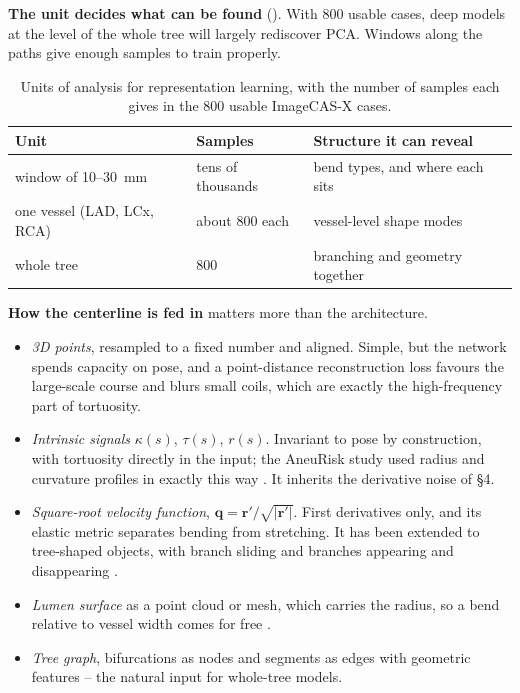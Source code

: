 \textbf{The unit decides what can be found} (). With 800 usable cases, deep
models at the level of the whole tree will largely rediscover PCA. Windows along the paths give
enough samples to train properly.

\begin{table}[htbp]
  \centering
  \small
  \begin{tabular}{@{}lll@{}}
    \toprule
    Unit & Samples & Structure it can reveal \\
    \midrule
    window of 10--30~mm & tens of thousands & bend types, and where each sits \\
    one vessel (LAD, LCx, RCA) & about 800 each & vessel-level shape modes \\
    whole tree & 800 & branching and geometry together \\
    \bottomrule
  \end{tabular}
  \caption{Units of analysis for representation learning, with the number of samples each gives
    in the 800 usable ImageCAS-X cases.}
  \label{tab:week3-units}
\end{table}

\textbf{How the centerline is fed in} matters more than the architecture.
\begin{itemize}
  \item \emph{3D points}, resampled to a fixed number and aligned. Simple, but the network spends
    capacity on pose, and a point-distance reconstruction loss favours the large-scale course and
    blurs small coils, which are exactly the high-frequency part of tortuosity.
  \item \emph{Intrinsic signals} $\kappa(s)$, $\tau(s)$, $r(s)$. Invariant to pose by
    construction, with tortuosity directly in the input; the AneuRisk study used radius and
    curvature profiles in exactly this way \cite{sangalli2009aneurisk}. It inherits the derivative
    noise of \S4.
  \item \emph{Square-root velocity function}, $\mathbf q = \mathbf r'/\sqrt{\lvert\mathbf r'\rvert}$.
    First derivatives only, and its elastic metric separates bending from stretching. It has been
    extended to tree-shaped objects, with branch sliding and branches appearing and disappearing
    \cite{wang2024elastictrees}.
  \item \emph{Lumen surface} as a point cloud or mesh, which carries the radius, so a bend relative
    to vessel width comes for free \cite{beetz2025pointvae, griffo2026wss}.
  \item \emph{Tree graph}, bifurcations as nodes and segments as edges with geometric features --
    the natural input for whole-tree models.
\end{itemize}

